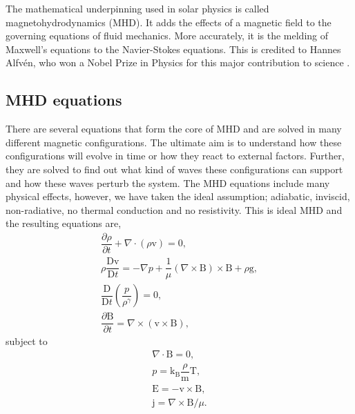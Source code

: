     The mathematical underpinning used in solar physics is called magnetohydrodynamics (MHD).
    It adds the effects of a magnetic field to the governing equations of fluid mechanics. 
    More accurately, it is the melding of Maxwell's equations to the Navier-Stokes equations.
    This is credited to Hannes Alfv\'en, who won a Nobel Prize in Physics for this major contribution to science \citep{1942Natur.150..405A,erdelyi2007}.

\subsection{MHD equations}

    There are several equations that form the core of MHD and are solved in many different magnetic configurations. 
    The ultimate aim is to understand how these configurations will evolve in time or how they react to external factors.
    Further, they are solved to find out what kind of waves these configurations can support and how these waves perturb the system. 
    The MHD equations include many physical effects, however, we have taken the ideal assumption; adiabatic, inviscid, non-radiative, no thermal conduction and no resistivity.
    This is ideal MHD and the resulting equations are,
    \begin{align}                                                         
        \dfrac{\partial \rho }{\partial t} + \nabla \cdot (\rho \boldsymbol{\mathrm{v}}) =       
        0,\tag{Mass Conservation}\\                                  
        \rho \dfrac{\mathrm{D}\boldsymbol{\mathrm{v}}}{\mathrm{D}t} =
        -\nabla p + \dfrac{1}{\mu}(\nabla \times \boldsymbol{\mathrm{B}}) \times \boldsymbol{\mathrm{B}} + \rho \boldsymbol{\mathrm{g}},\tag{Equation of Motion}\\
        \dfrac{\mathrm{D}}{\mathrm{D}t} \left(\dfrac{p}{\rho^\gamma} \right)  = 0,\tag{Energy Equation}\\       
        \dfrac{\partial \boldsymbol{\mathrm{B}}}{\partial t} = \nabla \times (\boldsymbol{\mathrm{v}} \times \boldsymbol{\mathrm{B}}),\tag{Induction Equation}               
    \end{align}
    subject to
    \begin{align}
        \nabla \cdot \boldsymbol{\mathrm{B}} = 0,\tag{Solenoid Equation}\\
        p = \mathrm{k_B} \dfrac{\rho}{\mathrm{m}} \mathrm{T},\tag{Ideal Gas Law}\\  
        \boldsymbol{\mathrm{E}} = - \boldsymbol{\mathrm{v}} \times \boldsymbol{\mathrm{B}},\tag{Ohm's Law}\\
        \boldsymbol{\mathrm{j}} = \nabla \times \boldsymbol{\mathrm{B}}/ \mu.\tag{Electric Current}                          
    \end{align}
